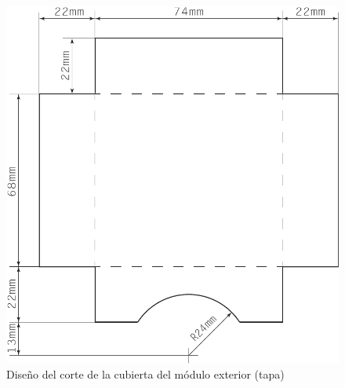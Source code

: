 \vfill

\clearpage

\begin{figure}
  \centering
  \includegraphics[height=1\columnwidth]{../design/exterior-cover-blueprint}
  \caption{Diseño del corte de la cubierta del módulo exterior (tapa)}
  \label{fig:exterior-cover-blueprint}
\end{figure}



